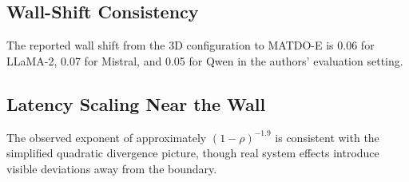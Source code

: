 \documentclass[11pt,a4paper]{article}
\theoremstyle{plain}
\theoremstyle{definition}
\begin{document}
\subsection{Wall-Shift Consistency}
The reported wall shift from the 3D configuration to MATDO-E is 0.06 for LLaMA-2, 0.07 for Mistral, and 0.05 for Qwen in the authors' evaluation setting.

\subsection{Latency Scaling Near the Wall}
The observed exponent of approximately $(1-\rho)^{-1.9}$ is consistent with the simplified quadratic divergence picture, though real system effects introduce visible deviations away from the boundary.
\end{document}
